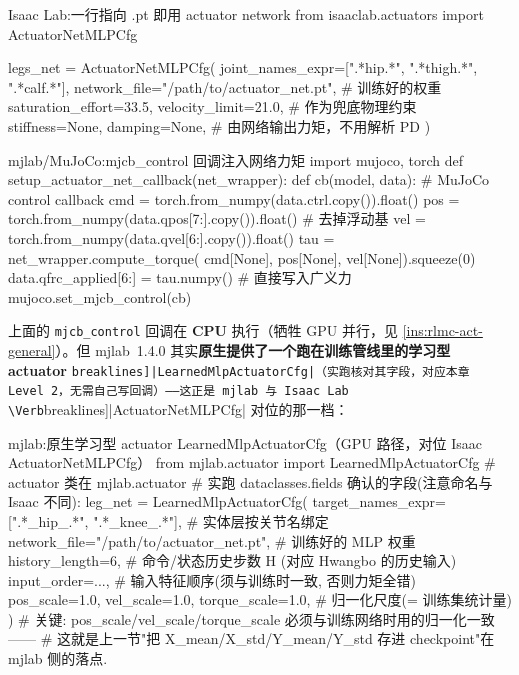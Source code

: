 \begin{codebox}[Python]{Isaac Lab:一行指向 .pt 即用 actuator network}
from isaaclab.actuators import ActuatorNetMLPCfg

legs_net = ActuatorNetMLPCfg(
    joint_names_expr=[".*hip.*", ".*thigh.*", ".*calf.*"],
    network_file="/path/to/actuator_net.pt",  # 训练好的权重
    saturation_effort=33.5, velocity_limit=21.0,  # 作为兜底物理约束
    stiffness=None, damping=None,             # 由网络输出力矩，不用解析 PD
)
\end{codebox}

\begin{codebox}[Python]{mjlab/MuJoCo:mjcb\_control 回调注入网络力矩}
import mujoco, torch
def setup_actuator_net_callback(net_wrapper):
    def cb(model, data):                       # MuJoCo control callback
        cmd = torch.from_numpy(data.ctrl.copy()).float()
        pos = torch.from_numpy(data.qpos[7:].copy()).float()  # 去掉浮动基
        vel = torch.from_numpy(data.qvel[6:].copy()).float()
        tau = net_wrapper.compute_torque(
            cmd[None], pos[None], vel[None]).squeeze(0)
        data.qfrc_applied[6:] = tau.numpy()    # 直接写入广义力
    mujoco.set_mjcb_control(cb)
\end{codebox}

\noindent 上面的 \verb|mjcb_control| 回调在 \textbf{CPU} 执行（牺牲 GPU 并行，见 \cref{ins:rlmc-act-general}）。但 mjlab~1.4.0 其实\textbf{原生提供了一个跑在训练管线里的学习型 actuator} \Verb[breaklines]|LearnedMlpActuatorCfg|（实跑核对其字段，对应本章 Level 2，无需自己写回调）——这正是 mjlab 与 Isaac Lab \Verb[breaklines]|ActuatorNetMLPCfg| 对位的那一档：

\begin{codebox}[Python]{mjlab:原生学习型 actuator LearnedMlpActuatorCfg（GPU 路径，对位 Isaac ActuatorNetMLPCfg）}
from mjlab.actuator import LearnedMlpActuatorCfg     # actuator 类在 mjlab.actuator
# 实跑 dataclasses.fields 确认的字段(注意命名与 Isaac 不同):
leg_net = LearnedMlpActuatorCfg(
    target_names_expr=[".*_hip_.*", ".*_knee_.*"],   # 实体层按关节名绑定
    network_file="/path/to/actuator_net.pt",         # 训练好的 MLP 权重
    history_length=6,        # 命令/状态历史步数 H (对应 Hwangbo 的历史输入)
    input_order=...,         # 输入特征顺序(须与训练时一致, 否则力矩全错)
    pos_scale=1.0, vel_scale=1.0, torque_scale=1.0,  # 归一化尺度(= 训练集统计量)
)
# 关键: pos_scale/vel_scale/torque_scale 必须与训练网络时用的归一化一致——
# 这就是上一节"把 X_mean/X_std/Y_mean/Y_std 存进 checkpoint"在 mjlab 侧的落点.
\end{codebox}

